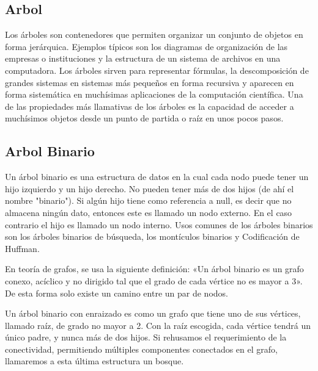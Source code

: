 \subsection{Arbol}
Los árboles son contenedores que permiten organizar un conjunto de objetos en forma 
jerárquica. Ejemplos típicos son los diagramas de organización de las empresas o 
instituciones y la estructura de un sistema de archivos en una computadora. Los  
árboles sirven para representar fórmulas, la descomposición de grandes sistemas en 
sistemas más pequeños en forma recursiva y aparecen en forma sistemática en muchísimas 
aplicaciones de la computación científica. Una de las propiedades más 
llamativas de los árboles es la capacidad de acceder a muchísimos objetos desde un 
punto de partida o raíz en unos pocos pasos.

\subsection{Arbol Binario}
Un árbol binario es una estructura de datos en la cual cada nodo puede tener un hijo izquierdo y un hijo derecho. No pueden tener más de dos hijos (de ahí el nombre "binario"). Si algún hijo tiene como referencia a null, es decir que no almacena ningún dato, entonces este es llamado un nodo externo. En el caso contrario el hijo es llamado un nodo interno. Usos comunes de los árboles binarios son los árboles binarios de búsqueda, los montículos binarios y Codificación de Huffman.

En teoría de grafos, se usa la siguiente definición: «Un árbol binario es un grafo conexo, acíclico y no dirigido tal que el grado de cada vértice no es mayor a 3». De esta forma solo existe un camino entre un par de nodos.

Un árbol binario con enraizado es como un grafo que tiene uno de sus vértices, llamado raíz, de grado no mayor a 2. Con la raíz escogida, cada vértice tendrá un único padre, y nunca más de dos hijos. Si rehusamos el requerimiento de la conectividad, permitiendo múltiples componentes conectados en el grafo, llamaremos a esta última estructura un bosque.